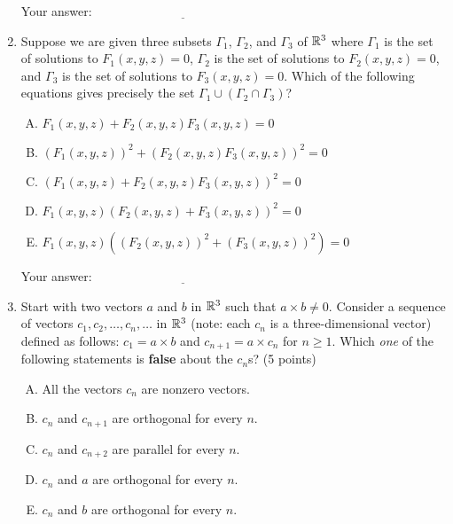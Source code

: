 \documentclass[10pt]{amsart}
\begin{document}
\begin{enumerate}
  \vspace{0.1in}
  Your answer: $\underline{\qquad\qquad\qquad\qquad\qquad\qquad\qquad}$
  \vspace{0.1in}

\item Suppose we are given three subsets $\Gamma_1$, $\Gamma_2$, and
  $\Gamma_3$ of $\mathbb{R}^3$ where $\Gamma_1$ is the set of solutions to
  $F_1(x,y,z) = 0$, $\Gamma_2$ is the set of solutions to $F_2(x,y,z)
  = 0$, and $\Gamma_3$ is the set of solutions to $F_3(x,y,z) =
  0$. Which of the following equations gives precisely the set
  $\Gamma_1 \cup (\Gamma_2 \cap \Gamma_3)$?

  \begin{enumerate}[(A)]
  \item $F_1(x,y,z) + F_2(x,y,z)F_3(x,y,z) = 0$
  \item $(F_1(x,y,z))^2 + (F_2(x,y,z)F_3(x,y,z))^2 = 0$
  \item $(F_1(x,y,z) + F_2(x,y,z)F_3(x,y,z))^2 = 0$
  \item $F_1(x,y,z)(F_2(x,y,z) + F_3(x,y,z))^2 = 0$
  \item $F_1(x,y,z)((F_2(x,y,z))^2 + (F_3(x,y,z))^2) = 0$
  \end{enumerate}

  \vspace{0.1in}
  Your answer: $\underline{\qquad\qquad\qquad\qquad\qquad\qquad\qquad}$
  \vspace{0.1in}

\item Start with two vectors $a$ and $b$ in $\mathbb{R}^3$ such that $a \times
  b \ne 0$. Consider a sequence of vectors $c_1, c_2, \dots, c_n,
  \dots$ in $\mathbb{R}^3$ (note: each $c_n$ is a three-dimensional vector)
  defined as follows: $c_1 = a \times b$ and $c_{n+1} = a \times c_n$
  for $n \ge 1$. Which {\em one} of the following statements is {\bf
  false} about the $c_n$s? (5 points)

  \begin{enumerate}[(A)]
  \item All the vectors $c_n$ are nonzero vectors.
  \item $c_n$ and $c_{n+1}$ are orthogonal for every $n$.
  \item $c_n$ and $c_{n+2}$ are parallel for every $n$.
  \item $c_n$ and $a$ are orthogonal for every $n$.
  \item $c_n$ and $b$ are orthogonal for every $n$.
  \end{enumerate}


\end{enumerate}
\end{document}
